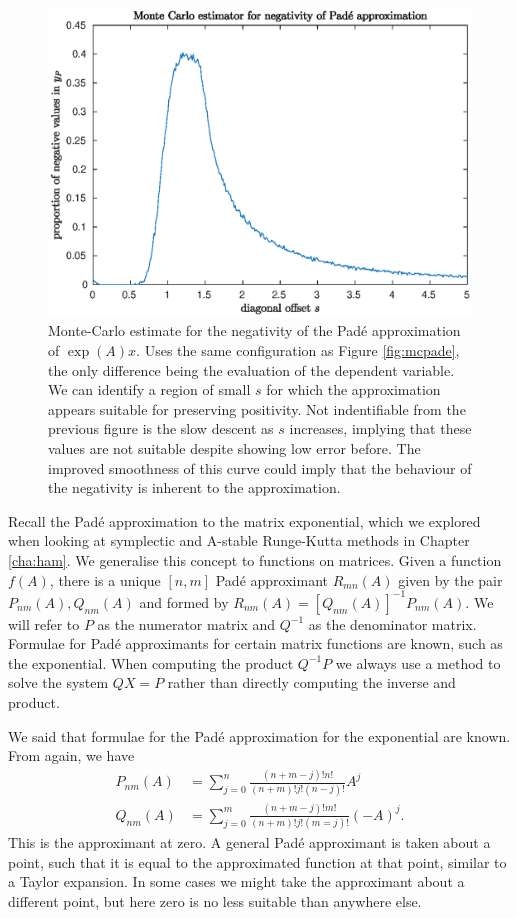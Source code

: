 \begin{figure}
    \centering
    \includegraphics[width=0.65\linewidth]{Matlab/padenegativemc.eps}
    \caption{
        Monte-Carlo estimate for the negativity of the Pad\'e approximation of $\exp(A)x$.
        Uses the same configuration as Figure \ref{fig:mcpade}, the only difference being the evaluation of the dependent variable.
        We can identify a region of small $s$ for which the approximation appears suitable for preserving positivity.
        Not indentifiable from the previous figure is the slow descent as $s$ increases, implying that these values are not suitable despite showing low error before.
        The improved smoothness of this curve could imply that the behaviour of the negativity is inherent to the approximation.
    }
    \label{fig:mcpadeneg}
\end{figure}

Recall the Pad\'e approximation to the matrix exponential, which we explored when looking at symplectic and A-stable Runge-Kutta methods in Chapter \ref{cha:ham}.
We generalise this concept to functions on matrices. Given a function $f(A)$, there is a unique $[n,m]$ Pad\'e approximant \cite{higham2008exponential} $R_{mn}(A)$ given by the pair $P_{nm}(A), Q_{nm}(A)$ and formed by $R_{nm}(A) = \left[Q_{nm}(A)\right]^{-1}P_{nm}(A)$.
We will refer to $P$ as the numerator matrix and $Q^{-1}$ as the denominator matrix.
Formulae for Pad\'e approximants for certain matrix functions are known, such as the exponential. 
When computing the product $Q^{-1}P$ we always use a method to solve the system $QX=P$ rather than directly computing the inverse and product.

We said that formulae for the Pad\'e approximation for the exponential are known. From \cite{moler2003dubious, higham2008exponential} again, we have
\begin{equation}
    \begin{aligned}
        P_{nm}(A) &= \sum_{j=0}^{n} \frac{(n+m-j)!n!}{(n+m)!j!(n-j)!}A^j \\
        Q_{nm}(A) &= \sum_{j=0}^{m} \frac{(n+m-j)!m!}{(n+m)!j!(m=j)!}(-A)^j.
    \end{aligned}
\end{equation}
This is the approximant at zero.
A general Pad\'e approximant is taken about a point, such that it is equal to the approximated function at that point, similar to a Taylor expansion.
In some cases we might take the approximant about a different point, but here zero is no less suitable than anywhere else.

